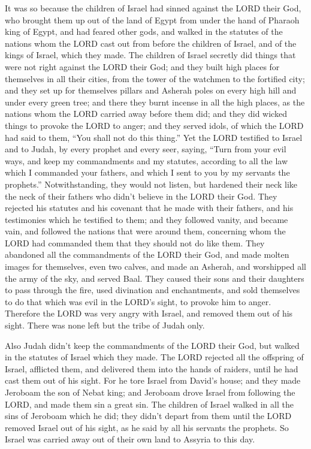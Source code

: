  It was so because the children of Israel had sinned
against the LORD their God, who brought them up out of the land of Egypt
from under the hand of Pharaoh king of Egypt, and had feared other gods,
 and walked in the statutes of the nations whom the LORD
cast out from before the children of Israel, and of the kings of Israel,
which they made.  The children of Israel secretly did
things that were not right against the LORD their God; and they built
high places for themselves in all their cities, from the tower of the
watchmen to the fortified city;  and they set up for
themselves pillars and Asherah poles on every high hill and under every
green tree;  and there they burnt incense in all the high
places, as the nations whom the LORD carried away before them did; and
they did wicked things to provoke the LORD to anger;  and
they served idols, of which the LORD had said to them, ``You shall not
do this thing.''  Yet the LORD testified to Israel and to
Judah, by every prophet and every seer, saying, ``Turn from your evil
ways, and keep my commandments and my statutes, according to all the law
which I commanded your fathers, and which I sent to you by my servants
the prophets.''  Notwithstanding, they would not listen,
but hardened their neck like the neck of their fathers who didn't
believe in the LORD their God.  They rejected his
statutes and his covenant that he made with their fathers, and his
testimonies which he testified to them; and they followed vanity, and
became vain, and followed the nations that were around them, concerning
whom the LORD had commanded them that they should not do like them.
 They abandoned all the commandments of the LORD their
God, and made molten images for themselves, even two calves, and made an
Asherah, and worshipped all the army of the sky, and served Baal.
 They caused their sons and their daughters to pass
through the fire, used divination and enchantments, and sold themselves
to do that which was evil in the LORD's sight, to provoke him to anger.
 Therefore the LORD was very angry with Israel, and
removed them out of his sight. There was none left but the tribe of
Judah only.

 Also Judah didn't keep the commandments of the LORD
their God, but walked in the statutes of Israel which they made.
 The LORD rejected all the offspring of Israel, afflicted
them, and delivered them into the hands of raiders, until he had cast
them out of his sight.  For he tore Israel from David's
house; and they made Jeroboam the son of Nebat king; and Jeroboam drove
Israel from following the LORD, and made them sin a great sin.
 The children of Israel walked in all the sins of
Jeroboam which he did; they didn't depart from them 
until the LORD removed Israel out of his sight, as he said by all his
servants the prophets. So Israel was carried away out of their own land
to Assyria to this day.

